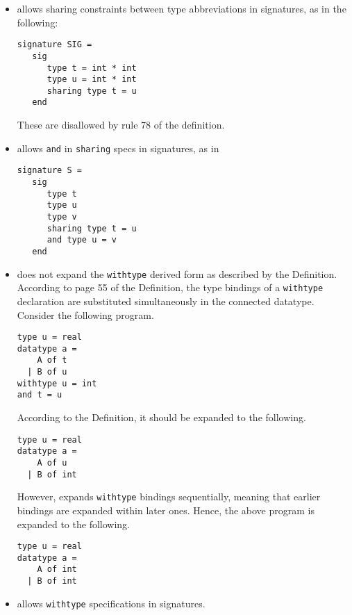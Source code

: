 \begin{itemize}
\item
{\smlnj} allows sharing constraints between type abbreviations in
signatures, as in the following:
\begin{verbatim}
signature SIG =
   sig
      type t = int * int
      type u = int * int
      sharing type t = u
   end
\end{verbatim}
These are disallowed by rule 78 of the definition.

\item
{\smlnj} allows {\tt and} in {\tt sharing} specs in signatures, as in
\begin{verbatim}
signature S =
   sig
      type t
      type u
      type v
      sharing type t = u
      and type u = v
   end
\end{verbatim}
%
\item
{\smlnj} does not expand the {\tt withtype} derived form as described by
the Definition.  According to page 55 of the Definition, the type
bindings of a {\tt withtype} declaration are substituted simultaneously
in the connected datatype.  Consider the following program.
\begin{verbatim}
type u = real
datatype a =
    A of t
  | B of u
withtype u = int
and t = u
\end{verbatim}
According to the Definition, it should be expanded to the following.
\begin{verbatim}
type u = real
datatype a =
    A of u
  | B of int
\end{verbatim}
However, {\smlnj} expands {\tt withtype} bindings sequentially, meaning
that earlier bindings are expanded within later ones.  Hence, the
above program is expanded to the following.
\begin{verbatim}
type u = real
datatype a =
    A of int
  | B of int
\end{verbatim}
%
\item
{\smlnj} allows {\tt withtype} specifications in signatures.


\end{itemize}
